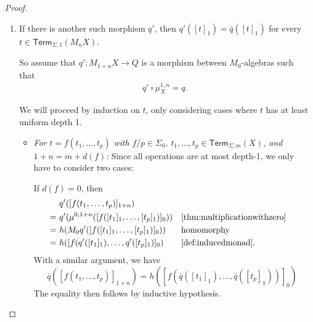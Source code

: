 \documentclass[11pt,a4paper]{amsart}
\newcommand{\Term}{\mathsf{Term}}
\newcommand{\sig}{\Sigma}
\newcommand{\sigp}{\Sigma_0}
\theoremstyle{plain}
\newcommand{\id}{\mathit{id}}
\numberwithin{equation}{section}
\newcommand{\+}[1]{\mathcal{#1}\xspace}
\theoremstyle{definition}
\begin{document}
\begin{proof}
\begin{enumerate}[wide]
            It then follows that
            \begin{align*}
                \bar{q}(\mu^{1, n}_X([t]_1))
                &= \bar{q}([t\sigma]_{1 + n}) && \text{\cref{thm:multiplicationsplitting}} \\
                &= q([s^n_X(t\sigma)]_1) && \text{definition of } \bar{q} \\
                &= q([t\bar{\sigma}]_1) && \text{\cref{thm:coequalizerproperties} \eqref{itm:substitutionlemmadepth1}} \\
                &= q(M_1 \id([t]_1)) && \text{\cref{def:inducedmonad} because } \sigma_{\id} = \bar{\sigma} \\
                &= q([t]_1) && \text{functoriality of } M_1.
            \end{align*}
        \item \label{itm:coequalizerunique}
            If there is another such morphism \(q'\), then \(q'([t]_1) = \bar{q}([t]_1)\) for every \(t \in \Term_{\sig, 1}(M_n X)\).

            So assume that \(q': M_{1 + n} X \to Q\) is a morphism between \(M_0\)-algebras such that
            \begin{gather}
                q' \circ \mu^{1, n}_X = q. \label{eq:qprimehasproperty}
            \end{gather}

            We will proceed by induction on \(t\), only considering cases where \(t\) has at least uniform depth 1.
            \begin{itemize}
                \item
                    \textit{For \(t = f(t_1, \ldots, t_p)\) with \(f/p \in \sigp\), \(t_1, \ldots, t_p \in \Term_{\sig, m}(X)\), and \(1 + n = m + d(f)\):}
                    Since all operations are at most depth-1, we only have to consider two cases:

                    If \(d(f) = 0\), then
                    \begin{align*}
                        &q'([f(t_1, \ldots, t_p)]_{1 + n}) \\
                        =~&q'(\mu^{0, 1 + n}([f([t_1]_1, \ldots, [t_p]_1)]_0)) && \text{\cref{thm:multiplicationwithzero}} \\
                        =~&h(M_0 q'([f([t_1]_1, \ldots, [t_p]_1)]_0)) && \text{homomorphy} \\
                        =~&h([f(q'([t_1]_1), \ldots, q'([t_p]_1)]_0) && \text{\cref{def:inducedmonad}}.
                    \end{align*}
                    With a similar argument, we have
                    \[
                        \bar{q}([f(t_1, \ldots, t_p)]_{1 + n}) = h([f(\bar{q}([t_1]_1), \ldots, \bar{q}([t_p]_1))]_0)
                    \]
                    The equality then follows by inductive hypothesis.


\end{itemize}
\end{enumerate}
\end{proof}
\end{document}
